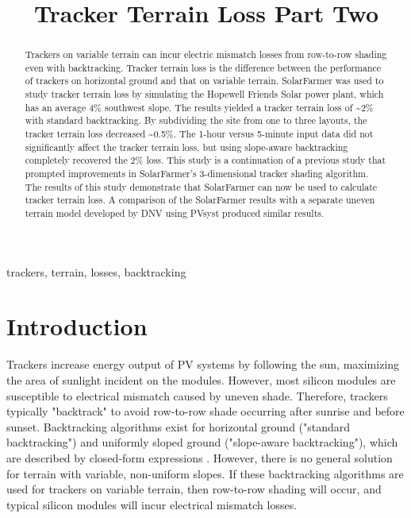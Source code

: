 \documentclass[conference]{IEEEtran}
\begin{document}
\title{Tracker Terrain Loss Part Two}

\author{
	}

\maketitle

\begin{abstract}
Trackers on variable terrain can incur electric mismatch losses from row-to-row shading even with backtracking. Tracker terrain loss is the difference between the performance of trackers on horizontal ground and that on variable terrain. SolarFarmer was used to study tracker terrain loss by simulating the Hopewell Friends Solar power plant, which has an average 4\% southwest slope. The results yielded a tracker terrain loss of \textasciitilde2\% with standard backtracking. By subdividing the site from one to three layouts, the tracker terrain loss decreased \textasciitilde0.5\%. The 1-hour versus 5-minute input data did not significantly affect the tracker terrain loss, but using slope-aware backtracking completely recovered the 2\% loss. This study is a continuation of a previous study that prompted improvements in SolarFarmer's 3-dimensional tracker shading algorithm. The results of this study demonstrate that SolarFarmer can now be used to calculate tracker terrain loss. A comparison of the SolarFarmer results with a separate uneven terrain model developed by DNV using PVsyst produced similar results.
\end{abstract}

\begin{IEEEkeywords}
trackers, terrain, losses, backtracking
\end{IEEEkeywords}

\section{Introduction}
Trackers increase energy output of PV systems by following the sun, maximizing the area of sunlight incident on the modules. However, most silicon modules are susceptible to electrical mismatch caused by uneven shade. Therefore, trackers typically "backtrack" to avoid  row-to-row shade occurring after sunrise and before sunset. Backtracking algorithms exist for horizontal ground ("standard backtracking") and uniformly sloped ground ("slope-aware backtracking"), which are described by closed-form expressions \cite{Marion2013,Anderson2020}. However, there is no general solution for terrain with variable, non-uniform slopes. If these backtracking algorithms are used for trackers on variable terrain, then row-to-row shading will occur, and typical silicon modules will incur electrical mismatch losses. 
\end{document}
